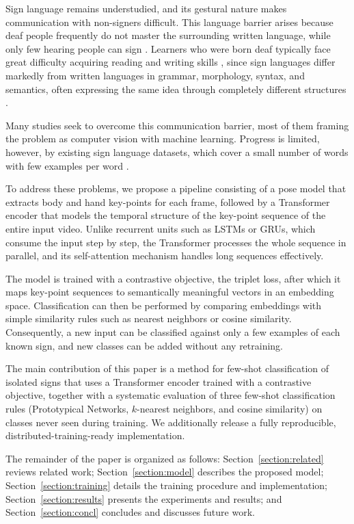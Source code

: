 \documentclass{article}
\begin{document}
Sign language remains understudied, and its gestural nature makes communication with non-signers difficult. This language barrier arises because deaf people frequently do not master the surrounding written language, while only few hearing people can sign \cite{barros2016traduccao}. Learners who were born deaf typically face great difficulty acquiring reading and writing skills \cite{da2017qlibras}, since sign languages differ markedly from written languages in grammar, morphology, syntax, and semantics, often expressing the same idea through completely different structures \cite{rocha2020towards}.

Many studies seek to overcome this communication barrier, most of them framing the problem as computer vision with machine learning. Progress is limited, however, by existing sign language datasets, which cover a small number of words with few examples per word \cite{li2020word}.

To address these problems, we propose a pipeline consisting of a pose model that extracts body and hand key-points for each frame, followed by a Transformer encoder that models the temporal structure of the key-point sequence of the entire input video. Unlike recurrent units such as LSTMs or GRUs, which consume the input step by step, the Transformer processes the whole sequence in parallel, and its self-attention mechanism handles long sequences effectively.

The model is trained with a contrastive objective, the triplet loss, after which it maps key-point sequences to semantically meaningful vectors in an embedding space. Classification can then be performed by comparing embeddings with simple similarity rules such as nearest neighbors or cosine similarity. Consequently, a new input can be classified against only a few examples of each known sign, and new classes can be added without any retraining.

The main contribution of this paper is a method for few-shot classification of isolated signs that uses a Transformer encoder trained with a contrastive objective, together with a systematic evaluation of three few-shot classification rules (Prototypical Networks, $k$-nearest neighbors, and cosine similarity) on classes never seen during training. We additionally release a fully reproducible, distributed-training-ready implementation.

The remainder of the paper is organized as follows: Section~\ref{section:related} reviews related work; Section~\ref{section:model} describes the proposed model; Section~\ref{section:training} details the training procedure and implementation; Section~\ref{section:results} presents the experiments and results; and Section~\ref{section:concl} concludes and discusses future work.
\end{document}
